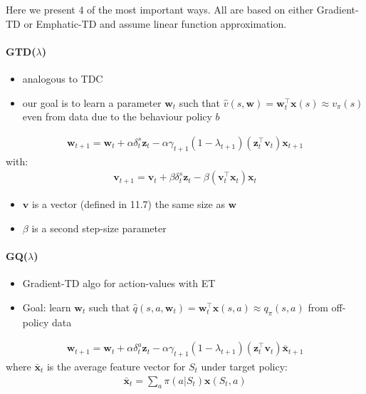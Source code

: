 \documentclass[sutton_barto_notes.tex]{subfiles}
\begin{document}
 Here we present 4 of the most important ways. All are based on either Gradient-TD or Emphatic-TD and assume linear function approximation. 

\paragraph{GTD($\lambda$)}
\begin{itemize}
\item analogous to TDC 
\item our goal is to learn a parameter $\mathbf{w}_{t}$ such that $\hat{v}(s, \mathbf{w}) = \mathbf{w}_t^{\top} \mathbf{x}(s) \approx v_{\pi}(s)$ even from data due to the behaviour policy $b$ 
\end{itemize}
\begin{align}
\mathbf{w}_{t+1} = \mathbf{w}_t + \alpha \delta_t^s \mathbf{z}_t - \alpha \gamma_{t+1}(1 - \lambda_{t+1})(\mathbf{z}_t^{\top} \mathbf{v}_t) \mathbf{x}_{t+1} \label{eq:12.35}\tag{12.35}
\end{align}
 with: 
\begin{align}
\mathbf{v}_{t+1} = \mathbf{v}_t + \beta \delta_t^s \mathbf{z}_t - \beta (\mathbf{v}_t^{\top} \mathbf{x}_t) \mathbf{x}_t \label{eq:12.36}\tag{12.36}
\end{align}

\begin{itemize}
\item $\mathbf{v}$ is a vector (defined in 11.7) the same size as $\mathbf{w}$ 
\item $\beta$ is a second step-size parameter 
\end{itemize}

\paragraph{GQ($\lambda$)}
\begin{itemize}
\item Gradient-TD algo for action-values with ET 
\item Goal: learn $\mathbf{w}_t$ such that $\hat{q}(s, a, \mathbf{w}_t) = \mathbf{w}_t^{\top} \mathbf{x}(s, a) \approx q_{\pi}(s, a)$ from off-policy data 
\end{itemize}
\begin{align}
\mathbf{w}_{t+1} = \mathbf{w}_t + \alpha \delta_t^a \mathbf{z}_t - \alpha \gamma_{t+1} (1 - \lambda_{t+1}) (\mathbf{z}_t^{\top} \mathbf{v}_t) \bar{\mathbf{x}}_{t+1} \label{eq:12.37}\tag{12.37}
\end{align}
 where $\bar{\mathbf{x}}_{t}$ is the average feature vector for $S_t$ under target policy: 
\begin{align}
\bar{\mathbf{x}}_{t} = \sum_a \pi(a|S_t) \mathbf{x}(S_t, a) \label{eq:12.38}\tag{12.38}
\end{align}
\end{document}
